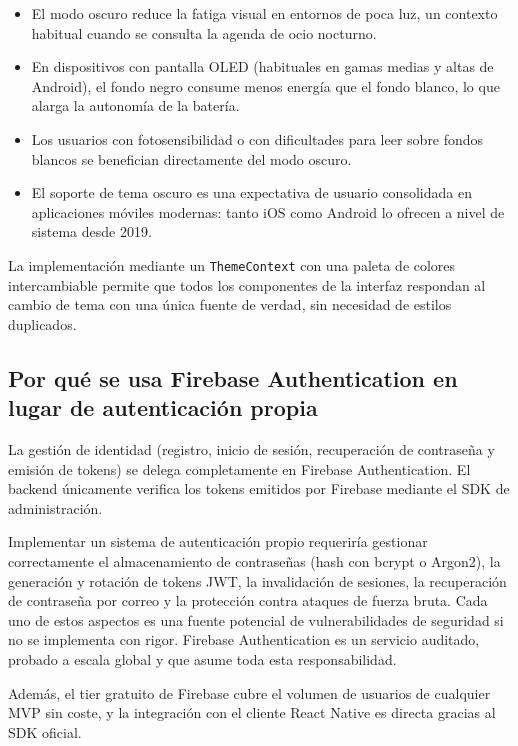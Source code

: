 \begin{itemize}
    \item El modo oscuro reduce la fatiga visual en entornos de poca luz, un contexto habitual cuando se consulta la agenda de ocio nocturno.
    \item En dispositivos con pantalla OLED (habituales en gamas medias y altas de Android), el fondo negro consume menos energía que el fondo blanco, lo que alarga la autonomía de la batería.
    \item Los usuarios con fotosensibilidad o con dificultades para leer sobre fondos blancos se benefician directamente del modo oscuro.
    \item El soporte de tema oscuro es una expectativa de usuario consolidada en aplicaciones móviles modernas: tanto iOS como Android lo ofrecen a nivel de sistema desde 2019.
\end{itemize}

La implementación mediante un \texttt{ThemeContext} con una paleta de colores intercambiable permite que todos los componentes de la interfaz respondan al cambio de tema con una única fuente de verdad, sin necesidad de estilos duplicados.

\subsection{Por qué se usa Firebase Authentication en lugar de autenticación propia}

La gestión de identidad (registro, inicio de sesión, recuperación de contraseña y emisión de tokens) se delega completamente en Firebase Authentication. El backend únicamente verifica los tokens emitidos por Firebase mediante el SDK de administración.

Implementar un sistema de autenticación propio requeriría gestionar correctamente el almacenamiento de contraseñas (hash con bcrypt o Argon2), la generación y rotación de tokens JWT, la invalidación de sesiones, la recuperación de contraseña por correo y la protección contra ataques de fuerza bruta. Cada uno de estos aspectos es una fuente potencial de vulnerabilidades de seguridad si no se implementa con rigor. Firebase Authentication es un servicio auditado, probado a escala global y que asume toda esta responsabilidad.

Además, el tier gratuito de Firebase cubre el volumen de usuarios de cualquier MVP sin coste, y la integración con el cliente React Native es directa gracias al SDK oficial.

